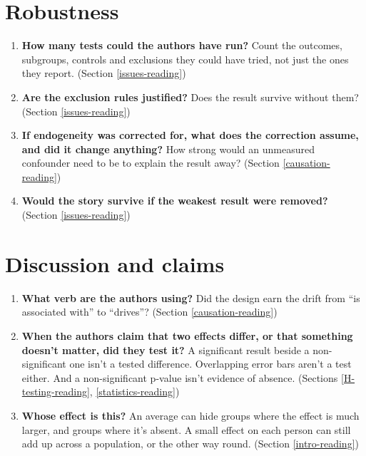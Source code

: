 \documentclass[
]{book}
\providecommand{\tightlist}{%
  \setlength{\itemsep}{0pt}\setlength{\parskip}{0pt}}
\begin{document}
\section{Robustness}\label{robustness}

\begin{enumerate}
\def\labelenumi{\arabic{enumi}.}
\setcounter{enumi}{23}
\tightlist
\item
  \textbf{How many tests could the authors have run?} Count the outcomes, subgroups, controls and exclusions they could have tried, not just the ones they report. (Section \ref{issues-reading})
\item
  \textbf{Are the exclusion rules justified?} Does the result survive without them? (Section \ref{issues-reading})
\item
  \textbf{If endogeneity was corrected for, what does the correction assume, and did it change anything?} How strong would an unmeasured confounder need to be to explain the result away? (Section \ref{causation-reading})
\item
  \textbf{Would the story survive if the weakest result were removed?} (Section \ref{issues-reading})
\end{enumerate}

\section{Discussion and claims}\label{discussion-and-claims}

\begin{enumerate}
\def\labelenumi{\arabic{enumi}.}
\setcounter{enumi}{27}
\tightlist
\item
  \textbf{What verb are the authors using?} Did the design earn the drift from ``is associated with'' to ``drives''? (Section \ref{causation-reading})
\item
  \textbf{When the authors claim that two effects differ, or that something doesn't matter, did they test it?} A significant result beside a non-significant one isn't a tested difference. Overlapping error bars aren't a test either. And a non-significant p-value isn't evidence of absence. (Sections \ref{H-testing-reading}, \ref{statistics-reading})
\item
  \textbf{Whose effect is this?} An average can hide groups where the effect is much larger, and groups where it's absent. A small effect on each person can still add up across a population, or the other way round. (Section \ref{intro-reading})
\end{enumerate}
\end{document}
